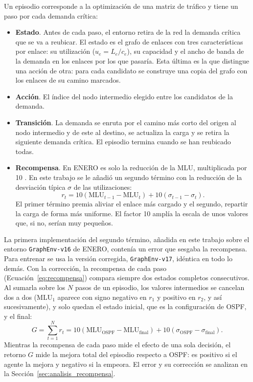 Un episodio corresponde a la optimización de una matriz de tráfico y tiene un paso por cada demanda crítica:

\begin{itemize}
	\item \textbf{Estado}. Antes de cada paso, el entorno retira de la red la demanda crítica que se va a reubicar. El estado es el grafo de enlaces con tres características por enlace: su utilización ($u_e = L_e/c_e$), su capacidad y el ancho de banda de la demanda en los enlaces por los que pasaría. Esta última es la que distingue una acción de otra: para cada candidato se construye una copia del grafo con los enlaces de su camino marcados.
	\item \textbf{Acción}. El índice del nodo intermedio elegido entre los candidatos de la demanda.
	\item \textbf{Transición}. La demanda se enruta por el camino más corto del origen al nodo intermedio y de este al destino, se actualiza la carga y se retira la siguiente demanda crítica. El episodio termina cuando se han reubicado todas.
	\item \textbf{Recompensa}. En ENERO es solo la reducción de la MLU, multiplicada por 10 \cite{ALMASAN2022109166}. En este trabajo se le añadió un segundo término con la reducción de la desviación típica $\sigma$ de las utilizaciones:
	\begin{equation}\label{eq:recompensa}
		r_t = 10\left(\mathrm{MLU}_{t-1} - \mathrm{MLU}_{t}\right) + 10\left(\sigma_{t-1} - \sigma_{t}\right).
	\end{equation}
	El primer término premia aliviar el enlace más cargado y el segundo, repartir la carga de forma más uniforme. El factor 10 amplía la escala de unos valores que, si no, serían muy pequeños.
\end{itemize}

La primera implementación del segundo término, añadida en este trabajo sobre el entorno \texttt{GraphEnv-v16} de ENERO, contenía un error que sesgaba la recompensa. Para entrenar se usa la versión corregida, \texttt{GraphEnv-v17}, idéntica en todo lo demás. Con la corrección, la recompensa de cada paso (Ecuación~\eqref{eq:recompensa}) compara siempre dos estados completos consecutivos. Al sumarla sobre los $N$ pasos de un episodio, los valores intermedios se cancelan dos a dos ($\mathrm{MLU}_1$ aparece con signo negativo en $r_1$ y positivo en $r_2$, y así sucesivamente), y solo quedan el estado inicial, que es la configuración de OSPF, y el final:
\begin{equation}\label{eq:retorno_v17}
	G = \sum_{t=1}^{N} r_t = 10\left(\mathrm{MLU}_{\text{OSPF}} - \mathrm{MLU}_{\text{final}}\right) + 10\left(\sigma_{\text{OSPF}} - \sigma_{\text{final}}\right).
\end{equation}
Mientras la recompensa de cada paso mide el efecto de una sola decisión, el retorno $G$ mide la mejora total del episodio respecto a OSPF: es positivo si el agente la mejora y negativo si la empeora. El error y su corrección se analizan en la Sección~\ref{sec:analisis_recompensa}.

